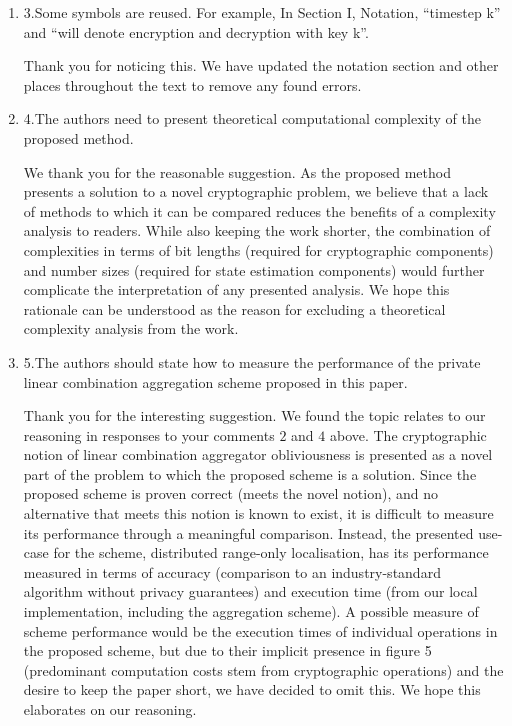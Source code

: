 \documentclass[a4paper]{scrartcl}
\newenvironment{rebuttal}{\begin{enumerate}[label={\color{grey}\thesection.\arabic{enumi}},leftmargin=0pt,ref=\thesection.\arabic{enumi}]}{\end{enumerate}}
\newcommand{\reviewtext}[1]{{\color{nblue} #1}}
\begin{document}
\begin{rebuttal}
\item \reviewtext{3.Some symbols are reused. For example, In Section I, Notation, “timestep k” and “will denote encryption and decryption with key k”.}

Thank you for noticing this. We have updated the notation section and other places throughout the text to remove any found errors.

\item \reviewtext{4.The authors need to present theoretical computational complexity of the proposed method.}

We thank you for the reasonable suggestion. As the proposed method presents a solution to a novel cryptographic problem, we believe that a lack of methods to which it can be compared reduces the benefits of a complexity analysis to readers. While also keeping the work shorter, the combination of complexities in terms of bit lengths (required for cryptographic components) and number sizes (required for state estimation components) would further complicate the interpretation of any presented analysis. We hope this rationale can be understood as the reason for excluding a theoretical complexity analysis from the work.

\item \reviewtext{5.The authors should state how to measure the performance of the private linear combination aggregation scheme proposed in this paper.}

Thank you for the interesting suggestion. We found the topic relates to our reasoning in responses to your comments $2$ and $4$ above. The cryptographic notion of linear combination aggregator obliviousness is presented as a novel part of the problem to which the proposed scheme is a solution. Since the proposed scheme is proven correct (meets the novel notion), and no alternative that meets this notion is known to exist, it is difficult to measure its performance through a meaningful comparison. Instead, the presented use-case for the scheme, distributed range-only localisation, has its performance measured in terms of accuracy (comparison to an industry-standard algorithm without privacy guarantees) and execution time (from our local implementation, including the aggregation scheme). A possible measure of scheme performance would be the execution times of individual operations in the proposed scheme, but due to their implicit presence in figure 5 (predominant computation costs stem from cryptographic operations) and the desire to keep the paper short, we have decided to omit this. We hope this elaborates on our reasoning.


\end{rebuttal}
\end{document}

